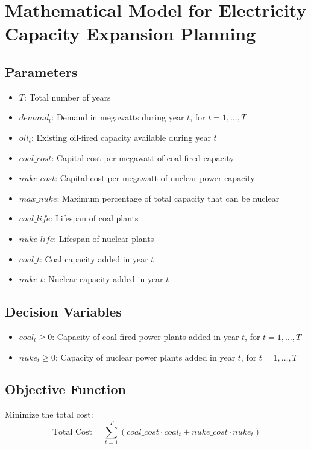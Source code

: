 \documentclass{article}
\begin{document}
\section*{Mathematical Model for Electricity Capacity Expansion Planning}

\subsection*{Parameters}
\begin{itemize}
    \item $T$: Total number of years
    \item $demand_t$: Demand in megawatts during year $t$, for $t = 1, \ldots, T$
    \item $oil_t$: Existing oil-fired capacity available during year $t$
    \item $coal\_cost$: Capital cost per megawatt of coal-fired capacity
    \item $nuke\_cost$: Capital cost per megawatt of nuclear power capacity
    \item $max\_nuke$: Maximum percentage of total capacity that can be nuclear
    \item $coal\_life$: Lifespan of coal plants
    \item $nuke\_life$: Lifespan of nuclear plants
    \item $coal\_t$: Coal capacity added in year $t$
    \item $nuke\_t$: Nuclear capacity added in year $t$
\end{itemize}

\subsection*{Decision Variables}
\begin{itemize}
    \item $coal_t \geq 0$: Capacity of coal-fired power plants added in year $t$, for $t = 1, \ldots, T$
    \item $nuke_t \geq 0$: Capacity of nuclear power plants added in year $t$, for $t = 1, \ldots, T$
\end{itemize}

\subsection*{Objective Function}
Minimize the total cost:
\[
\text{Total Cost} = \sum_{t=1}^{T} (coal\_cost \cdot coal_t + nuke\_cost \cdot nuke_t)
\]
\end{document}

